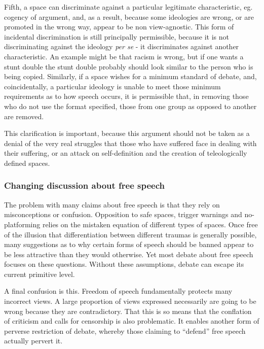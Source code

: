 Fifth, a space can discriminate against a particular legitimate
characteristic, eg. cogency of argument, and, as a result, because some
ideologies are wrong, or are promoted in the wrong way, appear to be non
view-agnostic. This form of incidental discrimination is still
principally permissible, because it is not discriminating against the
ideology \emph{per se} - it discriminates against another
characteristic. An example might be that racism is wrong, but if one
wants a stunt double the stunt double probably should look similar to
the person who is being copied. Similarly, if a space wishes for a
minimum standard of debate, and, coincidentally, a particular ideology
is unable to meet those minimum requirements as to how speech occurs, it
is permissible that, in removing those who do not use the format
specified, those from one group as opposed to another are removed.

This clarification is important, because this argument should not be
taken as a denial of the very real struggles that those who have
suffered face in dealing with their suffering, or an attack on
self-definition and the creation of teleologically defined spaces.

\subsubsection{Changing discussion about free
speech}\label{changing-discussion-about-free-speech}

The problem with many claims about free speech is that they rely on
misconceptions or confusion. Opposition to safe spaces, trigger warnings
and no-platforming relies on the mistaken equation of different types of
spaces. Once free of the illusion that differentiation between different
traumas is generally possible, many suggestions as to why certain forms
of speech should be banned appear to be less attractive than they would
otherwise. Yet most debate about free speech focuses on these questions.
Without these assumptions, debate can escape its current primitive
level.

A final confusion is this. Freedom of speech fundamentally protects many
incorrect views. A large proportion of views expressed necessarily are
going to be wrong because they are contradictory. That this is so means
that the conflation of criticism and calls for censorship is also
problematic. It enables another form of perverse restriction of debate,
whereby those claiming to ``defend'' free speech actually pervert it.

